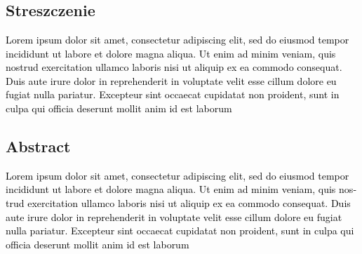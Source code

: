 \clearpage

\bigskip

\chapter*{}

\section*{Streszczenie}

\hypertarget{Toc448677641}{}\textcolor{black}{
    \indent
    Lorem ipsum dolor sit amet, consectetur adipiscing elit,
     sed do eiusmod tempor incididunt ut labore et dolore
      magna aliqua. Ut enim ad minim veniam, quis nostrud 
      exercitation ullamco laboris nisi ut aliquip ex ea 
      commodo consequat. Duis aute irure dolor in reprehenderit
       in voluptate velit esse cillum dolore eu fugiat nulla 
       pariatur. Excepteur sint occaecat cupidatat non proident,
        sunt in culpa qui officia deserunt mollit anim id est laborum
}

\bigskip

\section[ABSTRACT]{\foreignlanguage{english}{Abstract}}

\hypertarget{Toc448677642}{}\foreignlanguage{english}{\textcolor{black}{
    \indent
    Lorem ipsum dolor sit amet, consectetur adipiscing elit,
    sed do eiusmod tempor incididunt ut labore et dolore
     magna aliqua. Ut enim ad minim veniam, quis nostrud 
     exercitation ullamco laboris nisi ut aliquip ex ea 
     commodo consequat. Duis aute irure dolor in reprehenderit
      in voluptate velit esse cillum dolore eu fugiat nulla 
      pariatur. Excepteur sint occaecat cupidatat non proident,
       sunt in culpa qui officia deserunt mollit anim id est laborum
}}

